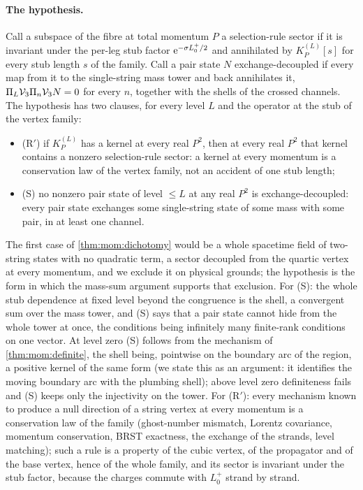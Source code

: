 \paragraph{The hypothesis.}
Call a subspace of the fibre at total momentum $P$ a selection-rule sector if it is invariant under the per-leg stub factor $\mathrm{e}^{- \sigma L_0^+ / 2}$ and annihilated by $K^{(L)}_P[s]$ for every stub length $s$ of the family.
Call a pair state $N$ exchange-decoupled if every map from it to the single-string mass tower and back annihilates it, $\Pi_L \mathcal{V}_{3} \Pi_n \mathcal{V}_{3} N = 0$ for every $n$, together with the shells of the crossed channels.
The hypothesis has two clauses, for every level $L$ and the operator at the stub of the vertex family:
\begin{itemize}
  \setlength{\itemsep}{1ex}

  \item (R$'$) if $K^{(L)}_P$ has a kernel at every real $P^2$, then at every real $P^2$ that kernel contains a nonzero selection-rule sector: a kernel at every momentum is a conservation law of the vertex family, not an accident of one stub length;

  \item (S) no nonzero pair state of level $\le L$ at any real $P^2$ is exchange-decoupled: every pair state exchanges some single-string state of some mass with some pair, in at least one channel.
\end{itemize}
The first case of \cref{thm:mom:dichotomy} would be a whole spacetime field of two-string states with no quadratic term, a sector decoupled from the quartic vertex at every momentum, and we exclude it on physical grounds; the hypothesis is the form in which the mass-sum argument supports that exclusion.
For (S): the whole stub dependence at fixed level beyond the congruence is the shell, a convergent sum over the mass tower, and (S) says that a pair state cannot hide from the whole tower at once, the conditions being infinitely many finite-rank conditions on one vector.
At level zero (S) follows from the mechanism of \cref{thm:mom:definite}, the shell being, pointwise on the boundary arc of the region, a positive kernel of the same form (we state this as an argument: it identifies the moving boundary arc with the plumbing shell); above level zero definiteness fails and (S) keeps only the injectivity on the tower.
For (R$'$): every mechanism known to produce a null direction of a string vertex at every momentum is a conservation law of the family (ghost-number mismatch, Lorentz covariance, momentum conservation, BRST exactness, the exchange of the strands, level matching); such a rule is a property of the cubic vertex, of the propagator and of the base vertex, hence of the whole family, and its sector is invariant under the stub factor, because the charges commute with $L_0^+$ strand by strand.
